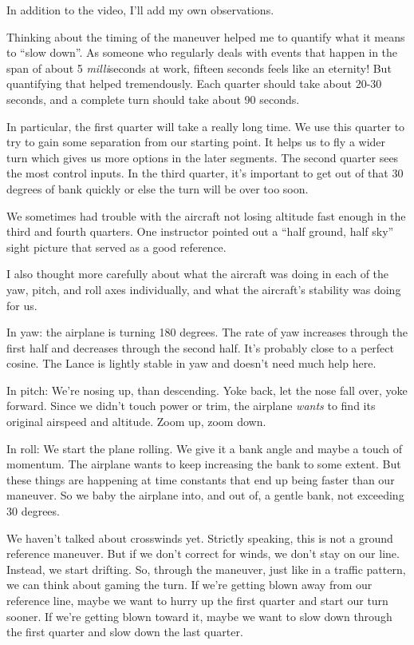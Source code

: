 In addition to the video, I'll add my own observations.

Thinking about the timing of the maneuver helped me to quantify what it means to ``slow down''. As someone who regularly deals with events that happen in the span of about 5 \emph{milli}seconds at work, fifteen seconds feels like an eternity! But quantifying that helped tremendously. Each quarter should take about 20-30 seconds, and a complete turn should take about 90 seconds.

In particular, the first quarter will take a really long time. We use this quarter to try to gain some separation from our starting point. It helps us to fly a wider turn which gives us more options in the later segments. The second quarter sees the most control inputs. In the third quarter, it's important to get out of that 30 degrees of bank quickly or else the turn will be over too soon.

We sometimes had trouble with the aircraft not losing altitude fast enough in the third and fourth quarters. One instructor pointed out a ``half ground, half sky'' sight picture that served as a good reference.

I also thought more carefully about what the aircraft was doing in each of the yaw, pitch, and roll axes individually, and what the aircraft's stability was doing for us.

In yaw: the airplane is turning 180 degrees. The rate of yaw increases through the first half and decreases through the second half. It's probably close to a perfect cosine. The Lance is lightly stable in yaw and doesn't need much help here.

In pitch: We're nosing up, than descending. Yoke back, let the nose fall over, yoke forward. Since we didn't touch power or trim, the airplane \emph{wants} to find its original airspeed and altitude. Zoom up, zoom down.

In roll: We start the plane rolling. We give it a bank angle and maybe a touch of momentum. The airplane wants to keep increasing the bank to some extent. But these things are happening at time constants that end up being faster than our maneuver. So we baby the airplane into, and out of, a gentle bank, not exceeding 30 degrees.

We haven't talked about crosswinds yet. Strictly speaking, this is not a ground reference maneuver. But if we don't correct for winds, we don't stay on our line. Instead, we start drifting. So, through the maneuver, just like in a traffic pattern, we can think about gaming the turn. If we're getting blown away from our reference line, maybe we want to hurry up the first quarter and start our turn sooner. If we're getting blown toward it, maybe we want to slow down through the first quarter and slow down the last quarter.


